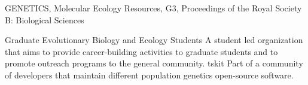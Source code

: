 {}
{GENETICS, Molecular Ecology Resources, G3, Proceedings of the Royal Society B: Biological Sciences}
{
}

{}
{Graduate Evolutionary Biology and Ecology Students}
{A student led organization that aims to provide career-building activities to graduate students and to promote outreach programs to the general community.}
%
{}
{tskit}
{Part of a community of developers that maintain different population genetics open-source software.}
%
